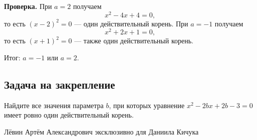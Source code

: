 \documentclass[12pt,a4paper]{article}
\newcommand{\result}{\textcolor{teal!60!black}{Итог:}}
\begin{document}
\textbf{Проверка.} При $a=2$ получаем
\[
x^2-4x+4=0,
\]
то есть $(x-2)^2=0$ --- один действительный корень. При $a=-1$ получаем
\[
x^2+2x+1=0,
\]
то есть $(x+1)^2=0$ --- также один действительный корень.

\result{} $a=-1$ или $a=2$.

\subsection*{Задача на закрепление}
Найдите все значения параметра $b$, при которых уравнение $x^2-2bx+2b-3=0$ имеет ровно один действительный корень.

\vfill
\begin{center}
\small Лёвин Артём Александрович эксклюзивно для Даниила Кичука
\end{center}
\end{document}
